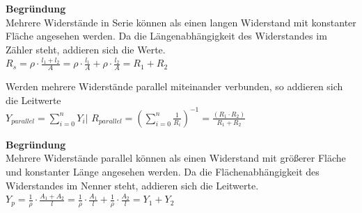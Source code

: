 							        \vspace{1em}

										\textbf{Begründung} \\
										Mehrere Widerstände in Serie können als einen langen Widerstand mit konstanter Fläche angesehen werden. Da die Längenabhängigkeit des Widerstandes im Zähler steht, addieren sich die Werte. \\
										$\displaystyle R_s = \rho \cdot \frac{l_1+l_2}{A} = \rho \cdot \frac{l_1}{A}  + \rho \cdot \frac{l_2}{A}  = R_1 + R_2 $
										\fix
										\begin{center}
										\end{center}
					\fix



										\beginip
										Werden mehrere Widerstände parallel miteinander verbunden, so addieren sich die Leitwerte \\
										\formulaBegin
										$\displaystyle Y_{parallel} = \sum_{i=0}^n Y_i \Bigg\rvert$
										$\displaystyle R_{parallel} = \left(\sum_{i=0}^n \frac{1}{R_i}\right)^{-1} = \frac{(R_1 \cdot R_2)}{R_1 + R_2}$
										\formulaEnd
										\iend

					          \vspace{1em}

					          \textbf{Begründung} \\
										Mehrere Widerstände parallel können als einen Widerstand mit größerer Fläche und konstanter Länge angesehen werden. Da die Flächenabhängigkeit des Widerstandes im Nenner steht, addieren sich die Leitwerte. \\
											$\displaystyle Y_p = \frac{1}{\rho} \cdot \frac{A_1 + A_2}{l} = \frac{1}{\rho} \cdot \frac{A_1}{l}  + \frac{1}{\rho} \cdot \frac{A_2}{l}  = Y_1 + Y_2 $


